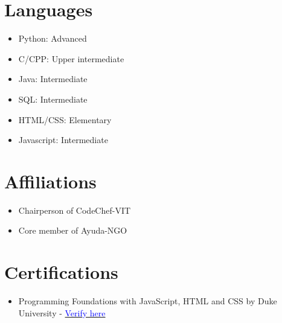 \documentclass[a4paper,10pt]{article}
\begin{document}
\vspace{10pt}

\section*{Languages}
\begin{itemize}
    \item Python: Advanced
    \item C/CPP: Upper intermediate
    \item Java: Intermediate
    \item SQL: Intermediate
    \item HTML/CSS: Elementary
    \item Javascript: Intermediate
\end{itemize}

\vspace{10pt}

\section*{Affiliations}
\begin{itemize}
    \item Chairperson of CodeChef-VIT
    \item Core member of Ayuda-NGO
\end{itemize}
\vspace{10pt}

\section*{Certifications}
\begin{itemize}
    \item Programming Foundations with JavaScript, HTML and CSS by Duke University - 
    \href{https://coursera.org/verify/ZZVTGPTSR36H}{\textcolor{blue}{Verify here}}
\end{itemize}
\end{document}
